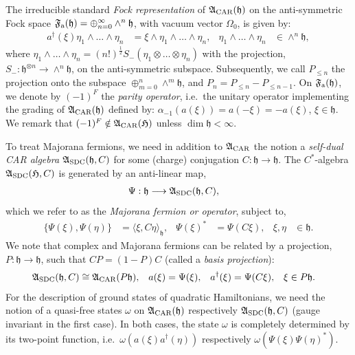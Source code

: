 \documentclass[a4paper, 11pt]{article}
\newcommand{\fA}{\mathfrak{A}}\newcommand{\cA}{\mathcal{A}}\newcommand{\dA}{\mathds{A}}\newcommand{\sA}{\mathscr{A}}
\newcommand{\ua}{\textup a}
\newcommand{\fF}{\mathfrak{F}}\newcommand{\cF}{\mathcal{F}}\newcommand{\dF}{\mathds{F}}\newcommand{\sF}{\mathscr{F}}
\newcommand{\fh}{\mathfrak{h}}
\newcommand{\fH}{\mathfrak{H}}\newcommand{\cH}{\mathcal{H}}\newcommand{\dH}{\mathds{H}}\newcommand{\sH}{\mathscr{H}}
\DeclareMathOperator{\1}{\mathds{1}}
\DeclareMathOperator{\CAR}{\textup{CAR}}
\DeclareMathOperator{\SDC}{\textup{SDC}}
\begin{document}
The irreducible standard \textit{Fock representation} of $\fA_{\CAR}(\fh)$ on the anti-symmetric Fock space $\fF_{\ua}(\fh) = \oplus_{n=0}^{\infty}\wedge^{n}\fh$, with vacuum vector $\Omega_{0}$, is given by:
\begin{align}
\label{eq:fockrep}
a^{\dag}(\xi)\eta_{1}\wedge\dots\wedge\eta_{n} & = \xi\wedge\eta_{1}\wedge\dots\wedge\eta_{n}, & \eta_{1}\wedge\dots\wedge\eta_{n} & \in\wedge^{n}\fh,
\end{align}
where $\eta_{1}\wedge\dots\wedge\eta_{n} = (n!)^{\frac{1}{2}}S_{-}(\eta_{1}\otimes\dots\otimes\eta_{n})$ with the projection, $S_{-}:\fh^{\otimes n}\rightarrow\wedge^{n}\fh$, on the anti-symmetric subspace. Subsequently, we call $P_{\leq n}$ the projection onto the subspace $\oplus_{m=0}^{n}\wedge^{m}\fh$, and $P_{n} = P_{\leq n}-P_{\leq n-1}$. On $\fF_{\ua}(\fh)$, we denote by $(-1)^{F}$ the \textit{parity operator}, i.e.~the unitary operator implementing the grading of $\fA_{\CAR}(\fh)$ defined by: $\alpha_{-1}(a(\xi)) = a(-\xi) = -a(\xi)$, $\xi\in\fh$. We remark that $(-1)^{F}\notin\fA_{\CAR}(\fH)$ unless $\dim\fh<\infty$.

To treat Majorana fermions, we need in addition to $\fA_{\CAR}$ the notion a \textit{self-dual CAR algebra} $\fA_{\SDC}(\fh,C)$ for some (charge) conjugation $C:\fh\rightarrow\fh$. The $C^{*}$-algebra $\fA_{\SDC}(\fH,C)$ is generated by an anti-linear map,
\begin{align}
\label{eq:majorana}
\Psi : \fh & \longrightarrow \fA_{\SDC}(\fh,C),
\end{align}
which we refer to as the \textit{Majorana fermion or operator}, subject to,
\begin{align}
\label{eq:sdc}
\{\Psi(\xi),\Psi(\eta)\} & = \langle\xi,C\eta\rangle_{\fh}, & \Psi(\xi)^{*} & = \Psi(C\xi), & \xi,\eta & \in\fh.
\end{align}
We note that complex and Majorana fermions can be related by a projection, $P:\fh\rightarrow\fh$, such that $CP=(1-P)C$ (called a \textit{basis projection}):
\begin{align}
\label{eq:carsdc}
\fA_{\SDC}(\fh,C) & \cong \fA_{\CAR}(P\fh), & a(\xi) & = \Psi(\xi), & a^{\dag}(\xi) & = \Psi(C\xi), & \xi & \in P\fh.  
\end{align}
For the description of ground states of quadratic Hamiltonians, we need the notion of a quasi-free states $\omega$ on $\fA_{\CAR}(\fh)$ respectively $\fA_{\SDC}(\fh,C)$ (gauge invariant in the first case). In both cases, the state $\omega$ is completely determined by its two-point function, i.e.~$\omega(a(\xi)a^{\dag}(\eta))$ respectively $\omega(\Psi(\xi)\Psi(\eta)^{*})$. 
\end{document}
